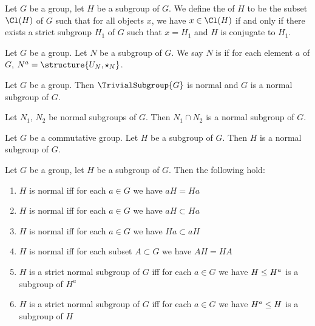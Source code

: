 \begin{definition}
Let $G$ be a group, let $H$ be a subgroup of $G$.
We define the  of $H$ to be the subset
$\Cl(H)$ of $G$ such that for all objects $x$, we have $x\in\Cl(H)$ if
and only if there exists a strict subgroup $H_{1}$ of $G$ such that
$x=H_{1}$ and $H$ is conjugate to $H_{1}$.
\end{definition}

\begin{definition}
Let $G$ be a group. Let $N$ be a subgroup of $G$.
We say $N$ is  if for each element $a$ of $G$,
$N^{a}=\structure{U_{N},\star_{N}}$.
\end{definition}

\begin{theorem}
Let $G$ be a group. Then $\TrivialSubgroup{G}$ is normal and $G$ is a
normal subgroup of $G$.
\end{theorem}

\begin{theorem}
Let $N_{1}$, $N_{2}$ be normal subgroups of $G$. Then $N_{1}\cap N_{2}$
is a normal subgroup of $G$.
\end{theorem}

\begin{theorem}
Let $G$ be a commutative group. Let $H$ be a subgroup of $G$. Then $H$
is a normal subgroup of $G$.
\end{theorem}

\begin{theorem}
Let $G$ be a group, let $H$ be a subgroup of $G$. Then the following hold:
\begin{enumerate}
\item{} $H$ is normal iff for each $a\in G$ we have $aH=Ha$
\item{} $H$ is normal iff for each $a\in G$ we have
  $aH\subset Ha$
\item{} $H$ is normal iff for each $a\in G$ we have
  $Ha\subset aH$
\item{} $H$ is normal iff for each subset $A\subset G$
  we have $AH=HA$
\item{} $H$ is a strict normal subgroup of $G$ iff for
  each $a\in G$ we have $H\leq H^{a}$ is a subgroup of $H^{a}$
\item{} $H$ is a strict normal subgroup of $G$ iff for
  each $a\in G$ we have $H^{a}\leq H$ is a subgroup of $H$
\end{enumerate}
\end{theorem}

